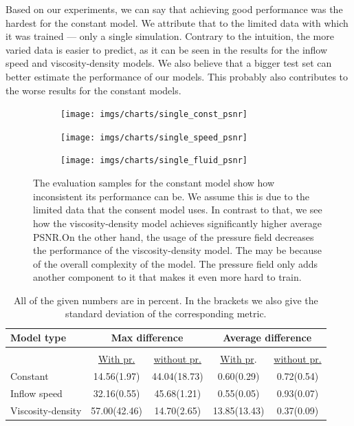 \documentclass{llncs}
\begin{document}
Based on our experiments, we can say that achieving good performance was the hardest for the constant model. We attribute that to the limited data with which it was trained --- only a single simulation. Contrary to the intuition, the more varied data is easier to predict, as it can be seen in the results for the inflow speed and viscosity-density models. We also believe that a bigger test set can better estimate the performance of our models. This probably also contributes to the worse results for the constant models.

\begin{figure}
  \begin{subfigure}{.3\textwidth}
    \centering
    \texttt{[image: imgs/charts/single\_const\_psnr]}
  \end{subfigure}
  \begin{subfigure}{.3\textwidth}
    \centering
    \texttt{[image: imgs/charts/single\_speed\_psnr]}
  \end{subfigure}
  \begin{subfigure}{.3\textwidth}
    \centering
    \texttt{[image: imgs/charts/single\_fluid\_psnr]}
  \end{subfigure}
  \caption{The evaluation samples for the constant model show how inconsistent its performance can be. We assume this is due to the limited data that the consent model uses. In contrast to that, we see how the viscosity-density model achieves significantly higher average PSNR.\@ On the other hand, the usage of the pressure field decreases the performance of the viscosity-density model. The may be because of the overall complexity of the model. The pressure field only adds another component to it that makes it even more hard to train.}\label{fig:single_psnr}
\end{figure}

\begin{table}
  \begin{center}
    \begin{tabular}{lcc|cc}
      \textbf{Model type} & \multicolumn{2}{c|}{\textbf{Max difference}}  &  \multicolumn{2}{c}{\textbf{Average difference}}\\
      \hline 
      \multicolumn{3}{c|}{}&&\\
                 & \underline{With pr.} & \underline{without pr.}  &  \underline{With pr}.& \underline{without pr.}\\
      
      Constant           &14.56(1.97)&44.04(18.73)&0.60(0.29)&0.72(0.54)  \\
      Inflow speed       &32.16(0.55)&45.68(1.21)&0.55(0.05)&0.93(0.07)   \\
      Viscosity-density  &57.00(42.46)&14.70(2.65)&13.85(13.43)&0.37(0.09)\\
    \end{tabular}
  \end{center}
  \caption{All of the given numbers are in percent. In the brackets we also give the standard deviation of the corresponding metric. }\label{tab:single}
\end{table}
\end{document}
